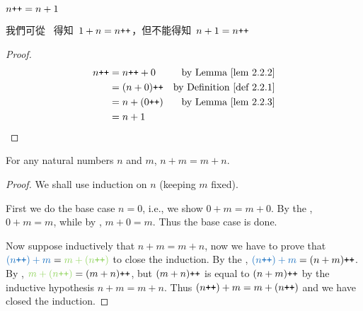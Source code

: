 \begin{additional corollary}  \label{ac 2.2.2}
\(n\texttt{++} = n +1\)
\begin{note}
我們可從\  得知\ \(1 + n = n\texttt{++}\)，但不能得知\ \(n + 1 = n\texttt{++}\)
\end{note}
\begin{proof}
    \begin{align*}
        n\INC & = n\INC + 0 & \text{by \LEM{2.2.2}} \\
              & = (n + 0)\INC & \text{by \DEF{2.2.1}} \\
              & = n + (0\INC) & \text{by \LEM{2.2.3}} \\
              & = n + 1
    \end{align*}
\end{proof}
\end{additional corollary}

\begin{proposition}\label{prop 2.2.4} For any natural numbers \(n\) and \(m\), \(n + m = m + n\).
\end{proposition}
\begin{proof}
We shall use induction on \(n\) (keeping \(m\) fixed).

First we do the base case \(n = 0\), i.e., we show \(0 + m = m + 0\). By the , \(0 + m = m\), while by , \(m + 0 = m\). Thus the base case is done.

Now suppose inductively that \(n + m = m + n\), now we have to prove that \(\BLUE{(n\INC) + m} = \GREEN{m +(n\INC)}\) to close the induction. By the , \(\BLUE{(n\INC) + m} = (n + m)\INC\). By , \(\GREEN{m + (n\INC)} = (m + n)\INC\), but \((m + n)\texttt{++}\) is equal to \((n + m)\texttt{++}\) by the inductive hypothesis \(n + m = m + n\). Thus \((n\texttt{++}) + m = m +(n\texttt{++})\) and we have closed the induction.
\end{proof}


